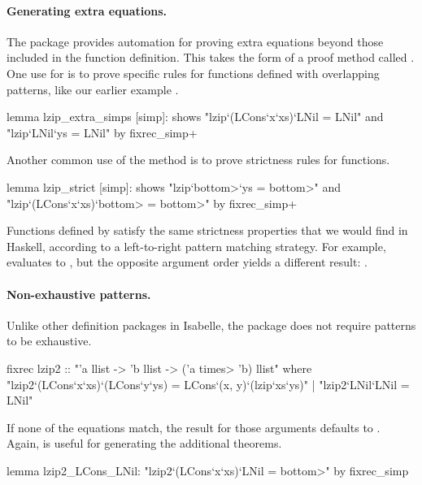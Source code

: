 \paragraph{Generating extra equations.} The {\fixrec} package provides automation for proving extra equations beyond those included in the function definition. This takes the form of a proof method called . One use for  is to prove specific rules for functions defined with overlapping patterns, like our earlier example .
%
\begin{isacode}
lemma lzip_extra_simps [simp]:
  shows "lzip`(LCons`x`xs)`LNil = LNil" and "lzip`LNil`ys = LNil"
  by fixrec_simp+
\end{isacode}
%
Another common use of the  method is to prove strictness rules for functions.
%
\begin{isacode}
lemma lzip_strict [simp]:
  shows "lzip`\<bottom>`ys = \<bottom>" and "lzip`(LCons`x`xs)`\<bottom> = \<bottom>"
  by fixrec_simp+
\end{isacode}
%
Functions defined by {\fixrec} satisfy the same strictness properties that we would find in Haskell, according to a left-to-right pattern matching strategy. For example,  evaluates to , but the opposite argument order yields a different result: .

\paragraph{Non-exhaustive patterns.} Unlike other definition packages in Isabelle, the {\fixrec} package does not require patterns to be exhaustive.
%
\begin{isacode}
fixrec lzip2 :: "'a llist -> 'b llist -> ('a \<times> 'b) llist"
  where "lzip2`(LCons`x`xs)`(LCons`y`ys) = LCons`(x, y)`(lzip`xs`ys)"
  | "lzip2`LNil`LNil = LNil"
\end{isacode}
%
If none of the equations match, the result for those arguments defaults to . Again,  is useful for generating the additional theorems.
%
\begin{isacode}
lemma lzip2_LCons_LNil: "lzip2`(LCons`x`xs)`LNil = \<bottom>"
  by fixrec_simp
\end{isacode}
\unmedskip

